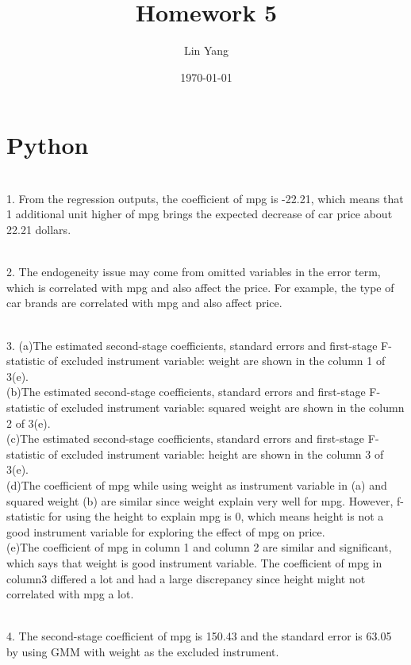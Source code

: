 \documentclass{article}
\title{Homework 5}
\author{Lin Yang}
\date{\today}
\begin{document}
\maketitle  
\section{Python}
~\\
1. From the regression outputs, the coefficient of mpg is -22.21, which means that 1 additional unit higher of mpg brings the expected decrease of car price about 22.21 dollars. 

~\\
2. The endogeneity issue may come from omitted variables in the error term, which  is correlated with mpg and also affect the price. For example, the type of car brands are correlated with mpg and also affect price. 

~\\
3. 
(a)The estimated second-stage coefficients, standard errors and first-stage F-statistic of excluded instrument variable: weight are shown in the column 1 of 3(e). \\

(b)The estimated second-stage coefficients, standard errors and first-stage F-statistic of excluded instrument variable: squared weight are shown in the column 2 of 3(e). \\


(c)The estimated second-stage coefficients, standard errors and first-stage F-statistic of excluded instrument variable: height are shown in the column 3 of 3(e).\\

(d)The coefficient of mpg while using weight as instrument variable in (a) and squared weight (b) are similar since weight explain very well for mpg. However, f-statistic for using the height to explain mpg is 0, which means height is not a good instrument variable for exploring the effect of mpg on price. \\

(e)The coefficient of mpg in column 1 and column 2 are similar and significant, which says that weight is good instrument variable. The coefficient of mpg in column3 differed a lot and had a large discrepancy since height might not correlated with mpg a lot. 

\begin{table}[H]
\centering

\end{table}

~\\
4. The second-stage coefficient of mpg is 150.43 and the standard error is 63.05 by using GMM with weight as the excluded instrument. 
\end{document}

